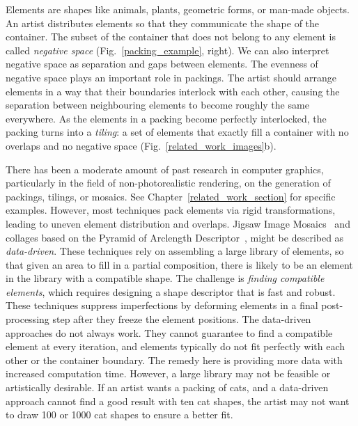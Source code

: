 Elements are shapes like animals,
plants, geometric forms, or man-made objects.
An artist distributes elements so that they communicate
the shape of the container. 
The subset of the container that does not belong to any element is
called \textit{negative space}
(Fig.~\ref{packing_example}, right).
We can also interpret negative space as separation and gaps between elements.
The evenness of negative space plays an important role in 
packings.  
The artist should arrange elements in a way that their boundaries interlock with each other,
causing the separation between neighbouring elements to become roughly the same everywhere.
As the elements in a packing become perfectly interlocked,
the packing turns into a \textit{tiling}: a set of elements that exactly
fill a container with no overlaps and no negative space (Fig.~\ref{related_work_images}b).



There has been a moderate amount of past research in computer
graphics, particularly in the field of non-photorealistic rendering,
on the generation of packings, tilings, or mosaics.  
See Chapter~\ref{related_work_section} for specific examples.  
However,  most techniques pack elements via rigid transformations, leading to
uneven element distribution and overlaps.  
Jigsaw Image Mosaics~\cite{Kim2002} and collages based on the Pyramid of Arclength
Descriptor~\cite{Kwan2016}, might be described as \textit{data-driven}.
These techniques rely on assembling a large library of elements, so that given an
area to fill in a partial composition, there is likely to be an
element in the library with a compatible shape.  The challenge is 
\textit{finding compatible elements}, 
which requires designing a shape descriptor that is fast and robust.
These techniques suppress imperfections by deforming
elements in a final post-processing step after they freeze the element positions.
The data-driven approaches do not always work.
They cannot guarantee to find a compatible element
at every iteration, and
elements typically do not fit perfectly with each other 
or the container boundary.
The remedy here is providing more data with increased computation time.
However, a large library may not be feasible or artistically desirable.
If an artist wants a packing of cats, and a data-driven approach 
cannot find a good result with ten cat shapes, 
the artist may not want to draw 100 or 1000 cat shapes to ensure a better fit.

